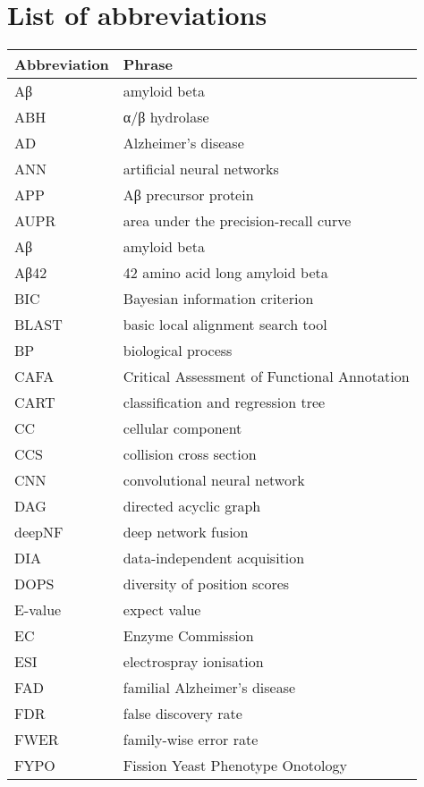 \listoftables
{}

\chapter*{List of abbreviations}

\begin{longtable}{ll}
    \toprule
    \textbf{Abbreviation} & \textbf{Phrase} \\ \midrule
    Aβ & amyloid beta \\
    ABH & α/β hydrolase \\
    AD & Alzheimer's disease \\
    ANN & artificial neural networks \\
    APP & Aβ precursor protein \\
    AUPR & area under the precision-recall curve \\
    Aβ & amyloid beta \\
    Aβ42 & 42 amino acid long amyloid beta \\
    BIC & Bayesian information criterion \\
    BLAST & basic local alignment search tool \\
    BP & biological process \\
    CAFA & Critical Assessment of Functional Annotation \\
    CART & classification and regression tree \\
    CC & cellular component \\
    CCS & collision cross section \\
    CNN & convolutional neural network \\
    DAG & directed acyclic graph \\
    deepNF & deep network fusion \\
    DIA & data-independent acquisition \\
    DOPS & diversity of position scores \\
    E-value & expect value \\
    EC & Enzyme Commission \\
    ESI & electrospray ionisation \\
    FAD & familial Alzheimer's disease \\
    FDR & false discovery rate \\
    FWER & family-wise error rate \\
    FYPO & Fission Yeast Phenotype Onotology \\

\end{longtable}
